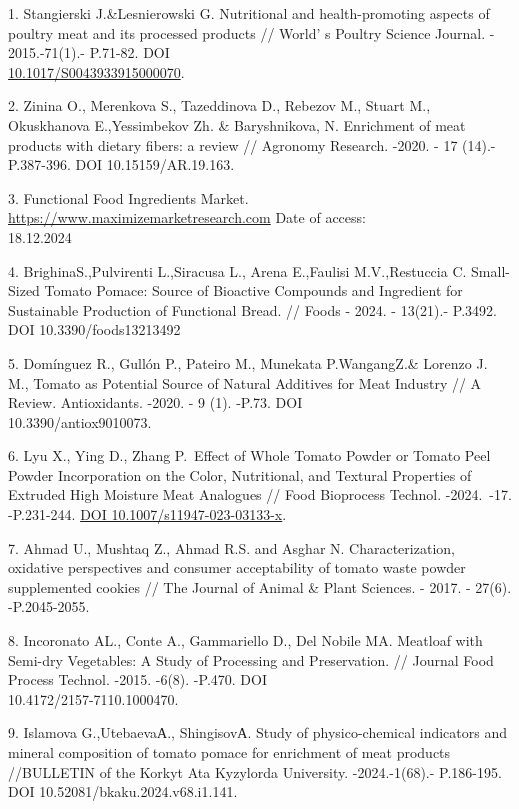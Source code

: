 \begin{references}
1. Stangierski J.\&Lesnierowski G. Nutritional and health-promoting
aspects of poultry meat and its proc\-essed products //
World' s Poultry Science Journal. - 2015.-71(1).-
P.71-82. DOI\\
\href{http://dx.doi.org/10.1017/S0043933915000070}{10.1017/S0043933915000070}.

2. Zinina O., Merenkova S., Tazeddinova D., Rebezov M., Stuart M.,
Okuskhanova E.,Yessimbekov Zh. \& Baryshnikova, N. Enrichment of meat
products with dietary fibers: a review // Agronomy Research. -2020. - 17
(14).- P.387-396. DOI 10.15159/AR.19.163.

3. Functional Food Ingredients Market.
\href{https://www.maximizemarketresearch.com/market-report/global-functional-food-market/101443/}{https://www.maximizemarketresearch.com}
Date of access: \\18.12.2024

4. BrighinaS.,Pulvirenti L.,Siracusa L., Arena E.,Faulisi M.V.,Restuccia
C. Small-Sized Tomato Pomace: Source of Bioactive Compounds and
Ingredient for Sustainable Production of Functional Bread. // Foods -
2024. - 13(21).- P.3492. DOI 10.3390/foods13213492

5. Domínguez R., Gullón P., Pateiro M., Munekata P.WangangZ.\& Lorenzo
J. M., Tomato as Potential Source of Natural Additives for Meat Industry
// A Review. Antioxidants. -2020. - 9 (1). -P.73.
DOI \\10.3390/antiox9010073.

6. Lyu X., Ying D., Zhang P.~Effect of Whole Tomato Powder or Tomato
Peel Powder Incorporation on the Color, Nutritional, and Textural
Properties of Extruded High Moisture Meat Analogues // Food Bioprocess
Technol. -2024.~-17. -P.231-244.
\href{https://doi.org/10.1007/s11947-023-03133-x}{DOI
10.1007/s11947-023-03133-x}.

7. Ahmad U., Mushtaq Z., Ahmad R.S. and Asghar N. Characterization,
oxidative perspectives and consumer acceptability of tomato waste powder
supplemented cookies // The Journal of Animal \& Plant Sciences. - 2017.
- 27(6). -P.2045-2055.

8. Incoronato AL., Conte A., Gammariello D., Del Nobile MA. Meatloaf
with Semi-dry Vegetables: A Study of Processing and Preservation. //
Journal Food Process Technol. -2015. -6(8). -P.470. DOI\\
10.4172/2157-7110.1000470.

9. Islamova G.,UtebaevaА., ShingisovА. Study of physico-chemical
indicators and mineral composition of tomato pomace for enrichment of
meat products //BULLETIN of the Korkyt Ata Kyzylorda University.
-2024.-1(68).- P.186-195. DOI 10.52081/bkaku.2024.v68.i1.141.


\end{references}
